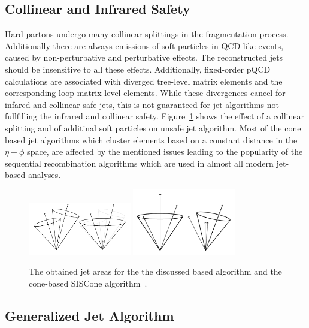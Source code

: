 \subsection{Collinear and Infrared Safety}
\label{section:coll_safety}

Hard partons undergo many collinear splittings in the fragmentation process.
Additionally there are always emissions of soft particles in QCD-like events,
caused by non-perturbative and perturbative effects. The reconstructed jets
should be insensitive to all these effects. Additionally, fixed-order pQCD
calculations are associated with diverged tree-level matrix elements and the
corresponding loop matrix level elements. While these divergences cancel for
infared and collinear safe jets, this is not guaranteed for jet algorithms not
fullfilling the infrared and collinear safety. Figure~\ref{fig:infrared_safety}
shows the effect of a collinear splitting and of additinal soft particles on
unsafe jet algorithm. Most of the cone based jet algorithms which cluster
elements based on a constant distance in the $\eta-\phi$ space, are affected by
the mentioned issues leading to the popularity of the sequential recombination
algorithms which are used in almost all modern jet-based analyses.

\begin{figure}[htb]
    \centering
    \includegraphics[width=0.4\textwidth]{figures/drawings/infrared_safety/jetinfrared.pdf}
    \includegraphics[width=0.4\textwidth]{figures/drawings/infrared_safety/jetcollinear.pdf}
    \caption{The obtained jet areas for the the discussed \kt based algorithm
        and the cone-based SISCone algorithm~\cite{Salam:2009jx}.}
    \label{fig:infrared_safety}
\end{figure}

\subsection{Generalized \kt Jet Algorithm}

